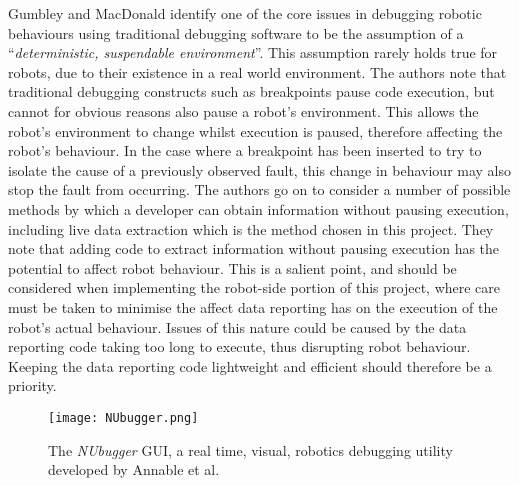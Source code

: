 Gumbley and MacDonald \cite{Gumbley:2009} identify one of the core issues in debugging robotic behaviours using traditional debugging software to be the assumption of a ``\textit{deterministic, suspendable environment}''. This assumption rarely holds true for robots, due to their existence in a real world environment. The authors note that traditional debugging constructs such as breakpoints pause code execution, but cannot for obvious reasons also pause a robot's environment. This allows the robot's environment to change whilst execution is paused, therefore affecting the robot's behaviour. In the case where a breakpoint has been inserted to try to isolate the cause of a previously observed fault, this change in behaviour may also stop the fault from occurring. The authors \cite{Gumbley:2009} go on to consider a number of possible methods by which a developer can obtain information without pausing execution, including live data extraction which is the method chosen in this project. They note that adding code to extract information without pausing execution has the potential to affect robot behaviour. This is a salient point, and should be considered when implementing the robot-side portion of this project, where care must be taken to minimise the affect data reporting has on the execution of the robot's actual behaviour. Issues of this nature could be caused by the data reporting code taking too long to execute, thus disrupting robot behaviour. Keeping the data reporting code lightweight and efficient should therefore be a priority.

\begin{figure}
 \begin{center}
 \texttt{[image: NUbugger.png]}
 \decoRule
 \caption[\textit{NUbugger} GUI. \cite{Annable:2014}]{The \textit{NUbugger} GUI, a real time, visual, robotics debugging utility developed by Annable et al. \cite{Annable:2014}}
 \label{fig:NUbugger}
 \end{center}
\end{figure}

